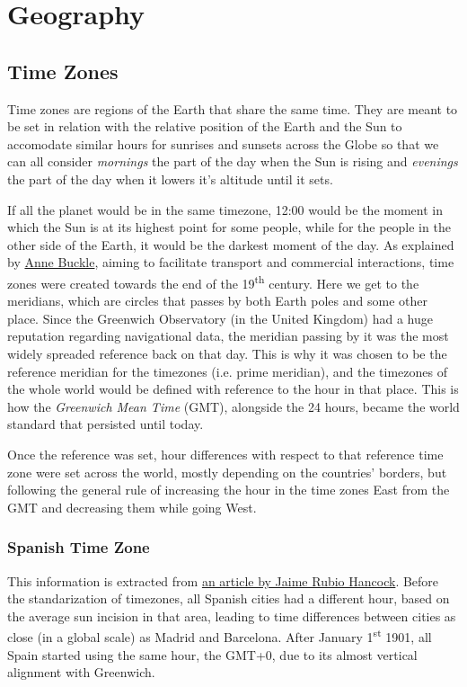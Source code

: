 \documentclass[../my_knowledge.tex]{subfiles}
\begin{document}
\chapter{Geography}

\newpage
\minitoc
\newpage

\section{Time Zones}
Time zones are regions of the Earth that share the same time. They are meant to be set in relation with the relative position of the Earth and the Sun to accomodate similar hours for sunrises and sunsets across the Globe so that we can all consider \textit{mornings} the part of the day when the Sun is rising and \textit{evenings} the part of the day when it lowers it's altitude until it sets.

If all the planet would be in the same timezone, 12:00 would be the moment in which the Sun is at its highest point for some people, while for the people in the other side of the Earth, it would be the darkest moment of the day. As explained by \href{https://www.timeanddate.com/time/time-zones-history.html}{Anne Buckle}\cite{timezones_origin}, aiming to facilitate transport and commercial interactions, time zones were created towards the end of the 19\textsuperscript{th} century. Here we get to the meridians, which are circles that passes by both Earth poles and some other place. Since the Greenwich Observatory (in the United Kingdom) had a huge reputation regarding navigational data, the meridian passing by it was the most widely spreaded reference back on that day. This is why it was chosen to be the reference meridian for the timezones (i.e. prime meridian), and the timezones of the whole world would be defined with reference to the hour in that place. This is how the \textit{Greenwich Mean Time} (GMT), alongside the 24 hours, became the world standard that persisted until today.

Once the reference was set, hour differences with respect to that reference time zone were set across the world, mostly depending on the countries' borders, but following the general rule of increasing the hour in the time zones East from the GMT and decreasing them while going West.

\subsection{Spanish Time Zone}
This information is extracted from \href{https://verne.elpais.com/verne/2018/09/01/articulo/1535793808_157511.html}{an article by Jaime Rubio Hancock}\cite{spanish_timezone}. Before the standarization of timezones, all Spanish cities had a different hour, based on the average sun incision in that area, leading to time differences between cities as close (in a global scale) as Madrid and Barcelona. After January 1\textsuperscript{st} 1901, all Spain started using the same hour, the GMT+0, due to its almost vertical alignment with Greenwich.
\end{document}
